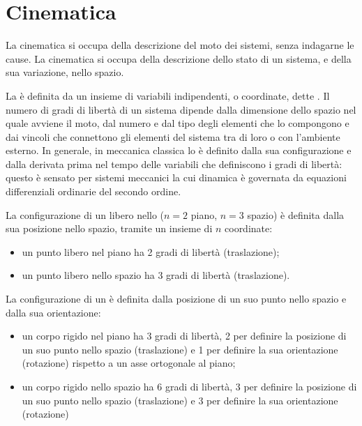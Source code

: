 \documentclass[letterpaper,10pt,italian]{jupyterBook}
\begin{document}
\sphinxstepscope


\chapter{Cinematica}
\label{\detokenize{ch/mechanics/kinematics:cinematica}}\label{\detokenize{ch/mechanics/kinematics:physics-hs-mechanics-kinematics}}\label{\detokenize{ch/mechanics/kinematics::doc}}
\sphinxAtStartPar
La cinematica si occupa della descrizione del moto dei sistemi, senza indagarne le cause. La cinematica si occupa della descrizione dello stato di un sistema, e della sua variazione, nello spazio.

\sphinxAtStartPar
La  è definita da un insieme di variabili indipendenti, o coordinate, dette .  Il numero di gradi di libertà di un sistema dipende dalla dimensione dello spazio nel quale avviene il moto, dal numero e dal tipo degli elementi che lo compongono e dai vincoli che connettono gli elementi del sistema tra di loro o con l’ambiente esterno.
In generale, in meccanica classica lo  è definito dalla sua configurazione e dalla derivata prima nel tempo delle variabili che definiscono i gradi di libertà: questo è sensato per sistemi meccanici la cui dinamica è governata da equazioni differenziali ordinarie del secondo ordine.

\sphinxAtStartPar
La configurazione di un  libero nello  (\(n=2\) piano, \(n=3\) spazio) è definita dalla sua posizione nello spazio, tramite un insieme di \(n\) coordinate:
\begin{itemize}
\item {} 
\sphinxAtStartPar
un punto libero nel piano ha 2 gradi di libertà (traslazione);

\item {} 
\sphinxAtStartPar
un punto libero nello spazio ha 3 gradi di libertà (traslazione).

\end{itemize}

\sphinxAtStartPar
La configurazione di un  è definita dalla posizione di un suo punto nello spazio e dalla sua orientazione:
\begin{itemize}
\item {} 
\sphinxAtStartPar
un corpo rigido nel piano ha 3 gradi di libertà, 2 per definire la posizione di un suo punto nello spazio (traslazione) e 1 per definire la sua orientazione (rotazione) rispetto a un asse ortogonale al piano;

\item {} 
\sphinxAtStartPar
un corpo rigido nello spazio ha 6 gradi di libertà, 3 per definire la posizione di un suo punto nello spazio (traslazione) e 3 per definire la sua orientazione (rotazione)

\end{itemize}
\end{document}
